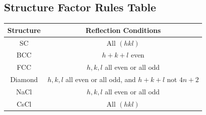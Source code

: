 \documentclass[12pt,a4paper]{article}
\begin{document}
\subsection{Structure Factor Rules Table}
\begin{table}[h]
\centering
\begin{tabular}{|c|c|}
\hline
\textbf{Structure} & \textbf{Reflection Conditions} \\
\hline
SC & All $(hkl)$ \\
BCC & $h+k+l$ even \\
FCC & $h,k,l$ all even or all odd \\
Diamond & $h,k,l$ all even or all odd, and $h+k+l$ not $4n+2$ \\
NaCl & $h,k,l$ all even or all odd \\
CsCl & All $(hkl)$ \\
\hline
\end{tabular}
\end{table}
\end{document}
